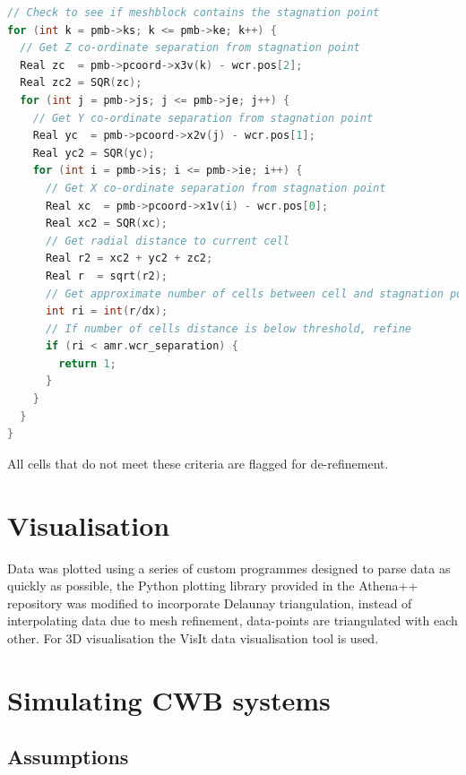 \begin{lstlisting}[language=c++]
// Check to see if meshblock contains the stagnation point
for (int k = pmb->ks; k <= pmb->ke; k++) {
  // Get Z co-ordinate separation from stagnation point
  Real zc  = pmb->pcoord->x3v(k) - wcr.pos[2];
  Real zc2 = SQR(zc);
  for (int j = pmb->js; j <= pmb->je; j++) {
    // Get Y co-ordinate separation from stagnation point
    Real yc  = pmb->pcoord->x2v(j) - wcr.pos[1];
    Real yc2 = SQR(yc);
    for (int i = pmb->is; i <= pmb->ie; i++) {
      // Get X co-ordinate separation from stagnation point
      Real xc  = pmb->pcoord->x1v(i) - wcr.pos[0];
      Real xc2 = SQR(xc);
      // Get radial distance to current cell
      Real r2 = xc2 + yc2 + zc2;
      Real r  = sqrt(r2);
      // Get approximate number of cells between cell and stagnation point
      int ri = int(r/dx);
      // If number of cells distance is below threshold, refine
      if (ri < amr.wcr_separation) {
        return 1;
      }
    }
  }
}
\end{lstlisting}

All cells that do not meet these criteria are flagged for de-refinement.

\section{Visualisation}

Data was plotted using a series of custom programmes designed to parse data as quickly as possible, 
the Python plotting library provided in the Athena++ repository was modified to incorporate Delaunay triangulation, instead of interpolating data due to mesh refinement, data-points are triangulated with each other.
For 3D visualisation the VisIt data visualisation tool is used.

\section{Simulating CWB systems}




\subsection{Assumptions}

